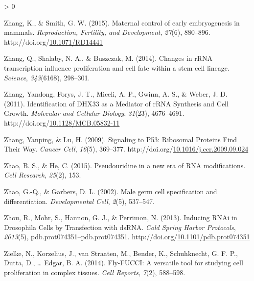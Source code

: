 \documentclass[12pt,oneside]{reedthesis}
\newlength{\cslhangindent}
\newenvironment{CSLReferences}[2] %
 {%
  \setlength{\parindent}{0pt}
  \ifodd #1 \everypar{\setlength{\hangindent}{\cslhangindent}}\ignorespaces\fi
  \ifnum #2 > 0
  \setlength{\parskip}{#2\baselineskip}
  \fi
 }%
 {}
\begin{document}
\begin{CSLReferences}{1}{0}
\leavevmode\hypertarget{ref-Zhang2015c}{}%
Zhang, K., \& Smith, G. W. (2015). Maternal control of early embryogenesis in mammals. \emph{Reproduction, Fertility, and Development}, \emph{27}(6), 880--896. http://doi.org/\href{https://doi.org/10.1071/RD14441}{10.1071/RD14441}

\leavevmode\hypertarget{ref-Zhang2014d}{}%
Zhang, Q., Shalaby, N. A., \& Buszczak, M. (2014). Changes in {rRNA} transcription influence proliferation and cell fate within a stem cell lineage. \emph{Science}, \emph{343}(6168), 298--301.

\leavevmode\hypertarget{ref-zhangIdentificationDHX33Mediator2011}{}%
Zhang, Yandong, Forys, J. T., Miceli, A. P., Gwinn, A. S., \& Weber, J. D. (2011). Identification of {DHX33} as a {Mediator} of {rRNA Synthesis} and {Cell Growth}. \emph{Molecular and Cellular Biology}, \emph{31}(23), 4676--4691. http://doi.org/\href{https://doi.org/10.1128/MCB.05832-11}{10.1128/MCB.05832-11}

\leavevmode\hypertarget{ref-zhangSignalingP53Ribosomal2009}{}%
Zhang, Yanping, \& Lu, H. (2009). Signaling to P53: {Ribosomal Proteins Find Their Way}. \emph{Cancer Cell}, \emph{16}(5), 369--377. http://doi.org/\href{https://doi.org/10.1016/j.ccr.2009.09.024}{10.1016/j.ccr.2009.09.024}

\leavevmode\hypertarget{ref-Zhao2015}{}%
Zhao, B. S., \& He, C. (2015). Pseudouridine in a new era of {RNA} modifications. \emph{Cell Research}, \emph{25}(2), 153.

\leavevmode\hypertarget{ref-Zhao2002d}{}%
Zhao, G.-Q., \& Garbers, D. L. (2002). Male germ cell specification and differentiation. \emph{Developmental Cell}, \emph{2}(5), 537--547.

\leavevmode\hypertarget{ref-zhouInducingRNAiDrosophila2013}{}%
Zhou, R., Mohr, S., Hannon, G. J., \& Perrimon, N. (2013). Inducing {RNAi} in {Drosophila Cells} by {Transfection} with {dsRNA}. \emph{Cold Spring Harbor Protocols}, \emph{2013}(5), pdb.prot074351--pdb.prot074351. http://doi.org/\href{https://doi.org/10.1101/pdb.prot074351}{10.1101/pdb.prot074351}

\leavevmode\hypertarget{ref-Zielke2014a}{}%
Zielke, N., Korzelius, J., van Straaten, M., Bender, K., Schuhknecht, G. F. P., Dutta, D., \ldots{} Edgar, B. A. (2014). Fly-{FUCCI}: {A} versatile tool for studying cell proliferation in complex tissues. \emph{Cell Reports}, \emph{7}(2), 588--598.

\end{CSLReferences}

\end{document}
